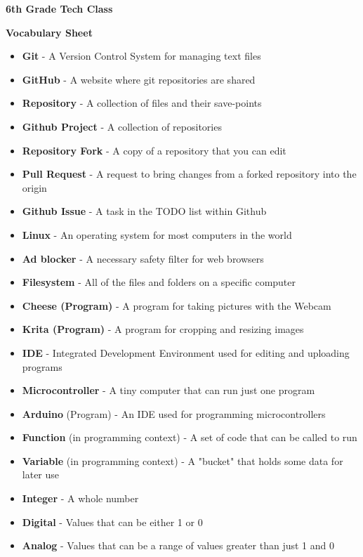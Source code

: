 \documentclass{article}
\begin{document}
	
{\huge \textbf{6th Grade Tech Class}}

\vspace{1cm}

{\huge \textbf{Vocabulary Sheet}}

\begin{itemize}
  \item \textbf{Git} - A Version Control System for managing text files
  \item \textbf{GitHub} - A website where git repositories are shared
  \item \textbf{Repository} - A collection of files and their save-points
  \item \textbf{Github Project} - A collection of repositories 
  \item \textbf{Repository Fork} - A copy of a repository that you can edit
  \item \textbf{Pull Request} - A request to bring changes from a forked repository into the origin
  \item \textbf{Github Issue} - A task in the TODO list within Github
  \item \textbf{Linux }- An operating system for most computers in the world
  \item \textbf{Ad blocker} - A necessary safety filter for web browsers
  \item \textbf{Filesystem }- All of the files and folders on a specific computer
  \item \textbf{Cheese (Program)} - A program for taking pictures with the Webcam
  \item \textbf{Krita (Program) }- A program for cropping and resizing images
  \item \textbf{IDE} - Integrated Development Environment used for editing and uploading programs
  \item \textbf{Microcontroller} - A tiny computer that can run just one program
  \item \textbf{Arduino} (Program) - An IDE used for programming microcontrollers
  \item \textbf{Function} (in programming context) - A set of code that can be called to run
  \item \textbf{Variable} (in programming context) - A "bucket" that holds some data for later use
  \item \textbf{Integer} - A whole number
  \item \textbf{Digital} - Values that can be either 1 or 0
  \item \textbf{Analog} - Values that can be a range of values greater than just 1 and 0

\end{itemize}
\end{document}
